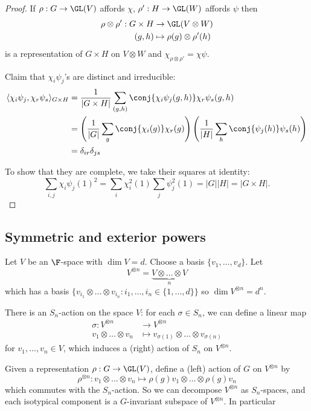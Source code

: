 \documentclass[a4paper]{article}
\theoremstyle{definition}
\begin{document}
\begin{proof}
  If \(\rho: G \to \GL(V)\) affords \(\chi\), \(\rho': H \to \GL(W)\) affords \(\psi\) then
  \begin{align*}
    \rho \otimes \rho': G \times H &\to \GL(V \otimes W) \\
    (g, h) &\mapsto \rho(g) \otimes \rho'(h)
  \end{align*}
  is a representation of \(G \times H\) on \(V \otimes W\) and \(\chi_{\rho \otimes \rho'} = \chi\psi\).

  Claim that \(\chi_i \psi_j\)'s are distinct and irreducible:
  \begin{align*}
    \langle \chi_i \psi_j, \chi_r \psi_s \rangle_{G \times H}
    &= \frac{1}{|G \times H|} \sum_{(g, h)} \conj{\chi_i\psi_j (g, h)} \chi_r \psi_s(g, h) \\
    &= \left( \frac{1}{|G|} \sum_g \conj{\chi_i(g)} \chi_r(g) \right) \left( \frac{1}{|H|} \sum_h \conj{\psi_j(h)} \psi_s(h) \right) \\
    &= \delta_{ir} \delta_{js}
  \end{align*}

  To show that they are complete, we take their squares at identity:
  \[
    \sum_{i, j} \chi_i \psi_j (1)^2
    = \sum_i \chi_i^2(1) \sum_j \psi_j^2(1)
    = |G| |H|
    = |G \times H|.
  \]
\end{proof}

\subsection{Symmetric and exterior powers}

Let \(V\) be an \(\F\)-space with \(\dim V = d\). Choose a basis \(\{v_1, \dots, v_d\}\). Let
\[
  V^{\otimes n} = \underbrace{V \otimes \dots \otimes V}_n
\]
which has a basis \(\{v_{i_1} \otimes \dots \otimes v_{i_n}: i_1, \dots, i_n \in \{1, \dots, d\}\}\) so \(\dim V^{\otimes n} = d^n\).

There is an \(S_n\)-action on the space \(V\): for each \(\sigma \in S_n\), we can define a linear map
\begin{align*}
  \sigma: V^{\otimes n} &\to V^{\otimes n} \\
  v_1 \otimes \dots \otimes v_n &\mapsto v_{\sigma(1)} \otimes \dots \otimes v_{\sigma(n)}
\end{align*}
for \(v_1, \dots, v_n \in V\), which induces a (right) action of \(S_n\) on \(V^{\otimes n}\).

Given a representation \(\rho: G \to \GL(V)\), define a (left) action of \(G\) on \(V^{\otimes n}\) by
\[
  \rho^{\otimes n}: v_1 \otimes \dots \otimes v_n \mapsto \rho(g) v_1 \otimes \dots \otimes \rho(g) v_n
\]
which commutes with the \(S_n\)-action. So we can decompose \(V^{\otimes n}\) as \(S_n\)-spaces, and each isotypical component is a \(G\)-invariant subspace of \(V^{\otimes n}\). In particular
\end{document}

